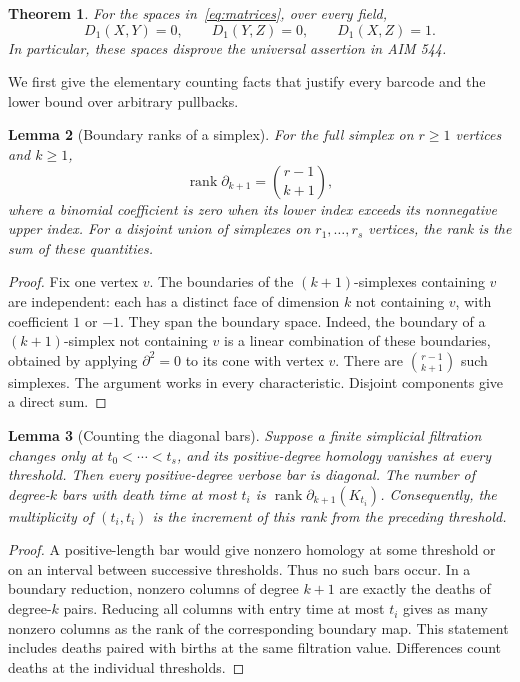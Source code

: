 \documentclass[11pt]{article}
\newtheorem{theorem}{Theorem}
\newtheorem{lemma}[theorem]{Lemma}
\theoremstyle{remark}
\newcommand{\rk}{\operatorname{rank}}
\begin{document}
\begin{theorem}\label{thm:four}
For the spaces in~\eqref{eq:matrices}, over every field,
\[
\boxed{D_1(X,Y)=0,\qquad D_1(Y,Z)=0,\qquad D_1(X,Z)=1.}
\]
In particular, these spaces disprove the universal assertion in AIM 544.
\end{theorem}

We first give the elementary counting facts that justify every barcode
and the lower bound over arbitrary pullbacks.

\begin{lemma}[Boundary ranks of a simplex]\label{lem:rank}
For the full simplex on $r\ge1$ vertices and $k\ge1$,
\[
\rk\partial_{k+1}=\binom{r-1}{k+1},
\]
where a binomial coefficient is zero when its lower index exceeds its
nonnegative upper index. For a disjoint union of simplexes on
$r_1,\ldots,r_s$ vertices, the rank is the sum of these quantities.
\end{lemma}
\begin{proof}
Fix one vertex $v$. The boundaries of the $(k+1)$-simplexes containing
$v$ are independent: each has a distinct face of dimension $k$ not
containing $v$, with coefficient $1$ or $-1$. They span the boundary
space. Indeed, the boundary of a $(k+1)$-simplex not containing $v$ is a
linear combination of these boundaries, obtained by applying
$\partial^2=0$ to its cone with vertex $v$. There are
$\binom{r-1}{k+1}$ such simplexes. The argument works in every characteristic.
Disjoint components give a direct sum.
\end{proof}

\begin{lemma}[Counting the diagonal bars]\label{lem:counts}
Suppose a finite simplicial filtration changes only at
$t_0<\cdots<t_s$, and its positive-degree homology vanishes at every
threshold. Then every positive-degree verbose bar is diagonal.
The number of degree-$k$ bars with death time at most $t_i$ is
$\rk\partial_{k+1}(K_{t_i})$.
Consequently, the multiplicity of $(t_i,t_i)$ is the increment of this
rank from the preceding threshold.
\end{lemma}
\begin{proof}
A positive-length bar would give nonzero homology at some threshold or
on an interval between successive thresholds. Thus no such bars occur.
In a boundary reduction, nonzero columns of degree $k+1$ are exactly the
deaths of degree-$k$ pairs. Reducing all columns with entry time at most
$t_i$ gives as many nonzero columns as the rank of the corresponding
boundary map. This statement includes deaths paired with births at the
same filtration value. Differences count deaths at the individual
thresholds.
\end{proof}
\end{document}
